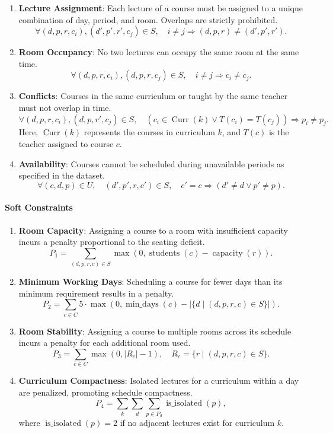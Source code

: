 \begin{enumerate}
    \item \textbf{Lecture Assignment}:
    Each lecture of a course must be assigned to a unique combination of day, period, and room. Overlaps are strictly prohibited.
    \[
    \forall (d, p, r, c_i), (d', p', r', c_j) \in S, \quad i \neq j \Rightarrow (d, p, r) \neq (d', p', r').
    \]

    \item \textbf{Room Occupancy}:
    No two lectures can occupy the same room at the same time.
    \[
    \forall (d, p, r, c_i), (d, p, r, c_j) \in S, \quad i \neq j \Rightarrow c_i \neq c_j.
    \]

    \item \textbf{Conflicts}:
    Courses in the same curriculum or taught by the same teacher must not overlap in time.
    \[
    \forall (d, p, r, c_i), (d, p, r', c_j) \in S, \quad (c_i \in \operatorname{Curr}(k) \lor T(c_i) = T(c_j)) \Rightarrow p_i \neq p_j.
    \]
    Here, \(\operatorname{Curr}(k)\) represents the courses in curriculum \(k\), and \(T(c)\) is the teacher assigned to course \(c\).

    \item \textbf{Availability}:
    Courses cannot be scheduled during unavailable periods as specified in the dataset.
    \[
    \forall (c, d, p) \in U, \quad (d', p', r, c') \in S, \quad c' = c \Rightarrow (d' \neq d \lor p' \neq p).
    \]
\end{enumerate}

\paragraph*{Soft Constraints}

\begin{enumerate}
    \item \textbf{Room Capacity}:
    Assigning a course to a room with insufficient capacity incurs a penalty proportional to the seating deficit.
    \[
    P_1 = \sum_{(d, p, r, c) \in S} \max(0, \operatorname{students}(c) - \operatorname{capacity}(r)).
    \]

    \item \textbf{Minimum Working Days}:
    Scheduling a course for fewer days than its minimum requirement results in a penalty.
    \[
    P_2 = \sum_{c \in C} 5 \cdot \max(0, \operatorname{min\_days}(c) - |\{d \mid (d, p, r, c) \in S\}|).
    \]

    \item \textbf{Room Stability}:
    Assigning a course to multiple rooms across its schedule incurs a penalty for each additional room used.
    \[
    P_3 = \sum_{c \in C} \max(0, |R_c| - 1), \quad R_c = \{r \mid (d, p, r, c) \in S\}.
    \]

    \item \textbf{Curriculum Compactness}:
    Isolated lectures for a curriculum within a day are penalized, promoting schedule compactness.
    \[
    P_4 = \sum_{k} \sum_{d} \sum_{p \in P_d} \operatorname{is\_isolated}(p),
    \]
    where \(\operatorname{is\_isolated}(p) = 2\) if no adjacent lectures exist for curriculum \(k\).
\end{enumerate}

